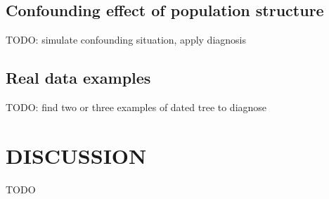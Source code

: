 \documentclass{article}
\begin{document}
\subsection*{Confounding effect of population structure} 

TODO: simulate confounding situation, apply diagnosis

\subsection*{Real data examples}

TODO: find two or three examples of dated tree to diagnose

\section*{DISCUSSION}

TODO 
\end{document}
